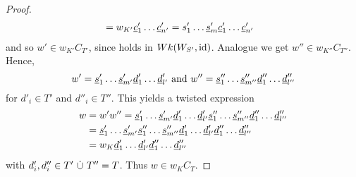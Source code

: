 \begin{theo}
\begin{proof}
\begin{align*}
				& = w_{K'} \underline{c}'_1 \ldots \underline{c}'_{n'} = s'_1 \ldots \underline{s}'_m \underline{c}'_1 \ldots \underline{c}'_{n'}
		\end{align*}
		and so $w' \in w_{K'}C_{T'}$, since  holds in $Wk(W_{S'},\operatorname{id})$. Analogue we get $w'' \in w_{K''}C_{T''}$. Hence,
		$$ w' = \underline{s}'_1 \ldots \underline{s}'_{m'} \underline{d}'_1 \ldots \underline{d}'_{l'} \textrm{ and } w'' = \underline{s}''_1 \ldots \underline{s}''_{m''} \underline{d}''_1 \ldots \underline{d}''_{l''} $$
		for $d'_i \in T'$ and $d''_i \in T''$. This yields a twisted expression
		\begin{align*}
			w	& = w' w'' = \underline{s}'_1 \ldots \underline{s}'_{m'} \underline{d}'_1 \ldots \underline{d}'_{l'} \underline{s}''_1 \ldots \underline{s}''_{m''} \underline{d}''_1 \ldots \underline{d}''_{l''} \\
				& = \underline{s}'_1 \ldots \underline{s}'_{m'} \underline{s}''_1 \ldots \underline{s}''_{m''} \underline{d}'_1 \ldots \underline{d}'_{l'} \underline{d}''_1 \ldots \underline{d}''_{l''} \\
				& = w_K \underline{d}'_1 \ldots \underline{d}'_{l'} \underline{d}''_1 \ldots \underline{d}''_{l''}
		\end{align*}
		with $d'_i,d''_i \in T' \ \dot \cup \  T'' = T$. Thus $w \in w_KC_T$.
	\end{proof}
\end{theo}